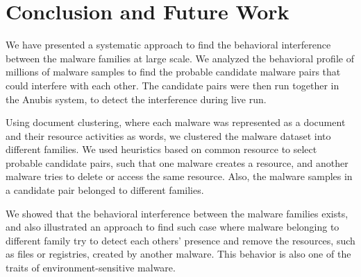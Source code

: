 \chapter{Conclusion and Future Work}\label{chapter:conclusion_and_future_work}
We have presented a systematic approach to find the behavioral interference between the malware families at large scale.
We analyzed the behavioral profile of millions of malware samples to find the probable candidate malware pairs that could interfere with each other.
The candidate pairs were then run together in the Anubis system, to detect the interference during live run.

Using document clustering, where each malware was represented as a document and their resource activities as words, we clustered the malware dataset into different families.
We used heuristics based on common resource to select probable candidate pairs, such that one malware creates a resource, and another malware tries to delete or access the same resource.
Also, the malware samples in a candidate pair belonged to different families.

We showed that the behavioral interference between the malware families exists, and also illustrated an approach to find such case where malware belonging to different family try to detect each others' presence and remove the resources, such as files or registries, created by another malware.
This behavior is also one of the traits of environment-sensitive malware.



